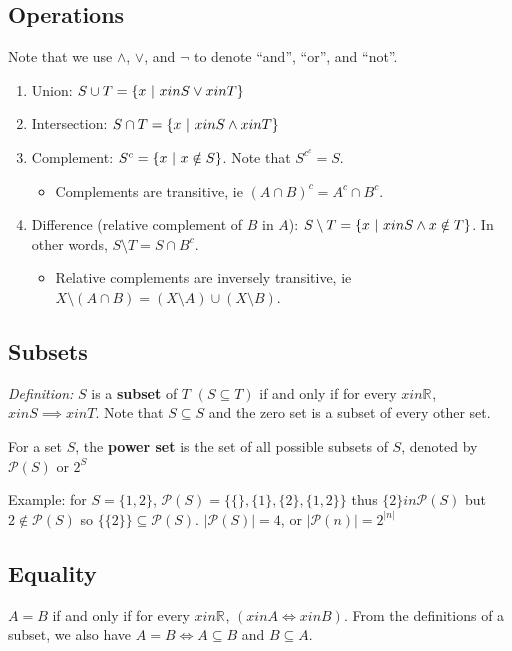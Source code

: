 \documentclass[12pt]{article}
\newcommand{\powerset}[1]{\mathcal{P}(#1)}
\newcommand{\R}[1]{\mathbb{R}^{#1}}
\begin{document}
\subsection*{Operations}
Note that we use $\land$, $\lor$, and $\neg$ to denote ``and'', ``or'', and ``not''.
\begin{enumerate}
\item Union: $S \cup T = \{ x \ |\  x in S \lor x in T \}$
\item Intersection: $S \cap T = \{ x \ |\  x in S \land x in T \}$
\item Complement: $S^c = \{ x \ |\  x \notin S \}$. Note that $S^{c^c} = S$.
\begin{itemize}
\item Complements are transitive, ie $(A \cap B)^c = A^c \cap B^c$.
\end{itemize}
\item Difference (relative complement of $B$ in $A$): $S \setminus T = \{ x \ |\  x in S \land x \notin T \}$. In other words, $S \setminus T = S \cap B^c$.
\begin{itemize}
\item Relative complements are inversely transitive, ie $X \setminus (A \cap B) = (X \setminus A) \cup (X \setminus B)$.
\end{itemize}
\end{enumerate}

\subsection*{Subsets}
\textit{Definition: } $S$ is a {\bf subset} of $T$ $(S \subseteq T)$ if and only if for every $x in \R{}$, $x in S \implies x in T$. Note that $S \subseteq S$ and the zero set is a subset of every other set.

For a set $S$, the {\bf power set} is the set of all possible subsets of $S$, denoted by $\powerset{S}$ or $2^S$

Example: for $S = \{ 1,2 \}$, $\powerset{S} = \bigl\{ \{\}, \{1\}, \{2\}, \{1,2\} \bigl\}$ thus $\{2\} in \powerset{S}$ but $2 \notin \powerset{S}$ so $\bigl\{ \{2\} \bigl\} \subseteq \powerset{S}$. $|\powerset{S}| = 4$, or $|\powerset{n}| = 2^{|n|}$

\subsection*{Equality}
$A = B$ if and only if for every $x in \R{}$, $(x in A \iff x in B)$. From the definitions of a subset, we also have $A = B \iff A \subseteq B$ and $B \subseteq A$.
\end{document}
